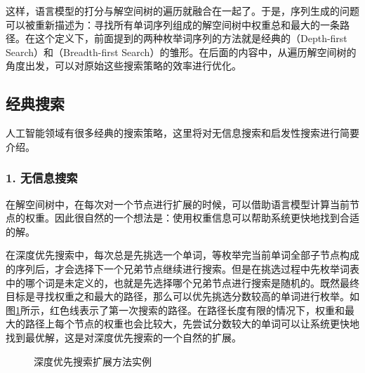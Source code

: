 \parinterval 这样，语言模型的打分与解空间树的遍历就融合在一起了。于是，序列生成的问题可以被重新描述为：寻找所有单词序列组成的解空间树中权重总和最大的一条路径。在这个定义下，前面提到的两种枚举词序列的方法就是经典的{\small{}}（Depth-first Search）和{\small{}}（Breadth-first Search）的雏形。在后面的内容中，从遍历解空间树的角度出发，可以对原始这些搜索策略的效率进行优化。


\subsection{经典搜索}

\parinterval 人工智能领域有很多经典的搜索策略，这里将对无信息搜索和启发性搜索进行简要介绍。


\subsubsection{1. 无信息搜索}

\parinterval 在解空间树中，在每次对一个节点进行扩展的时候，可以借助语言模型计算当前节点的权重。因此很自然的一个想法是：使用权重信息可以帮助系统更快地找到合适的解。

\parinterval 在深度优先搜索中，每次总是先挑选一个单词，等枚举完当前单词全部子节点构成的序列后，才会选择下一个兄弟节点继续进行搜索。但是在挑选过程中先枚举词表中的哪个词是未定义的，也就是先选择哪个兄弟节点进行搜索是随机的。既然最终目标是寻找权重之和最大的路径，那么可以优先挑选分数较高的单词进行枚举。如图\ref{fig:2-16}所示，红色线表示了第一次搜索的路径。在路径长度有限的情况下，权重和最大的路径上每个节点的权重也会比较大，先尝试分数较大的单词可以让系统更快地找到最优解，这是对深度优先搜索的一个自然的扩展。

\begin{figure}[htp]
    \centering
 	
	\caption{深度优先搜索扩展方法实例}
    \label{fig:2-16}
\end{figure}

